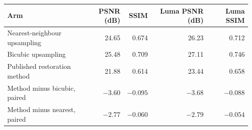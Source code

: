 \begin{tabular}{lrrrr}
\toprule
Arm & PSNR (dB) & SSIM & Luma PSNR (dB) & Luma SSIM \\
\midrule
Nearest-neighbour upsampling & 24.65 & 0.674 & 26.23 & 0.712 \\
Bicubic upsampling & 25.48 & 0.709 & 27.11 & 0.746 \\
Published restoration method & 21.88 & 0.614 & 23.44 & 0.658 \\
\midrule
Method minus bicubic, paired & $-3.60$ & $-0.095$ & $-3.68$ & $-0.088$ \\
Method minus nearest, paired & $-2.77$ & $-0.060$ & $-2.79$ & $-0.054$ \\
\bottomrule
\end{tabular}
